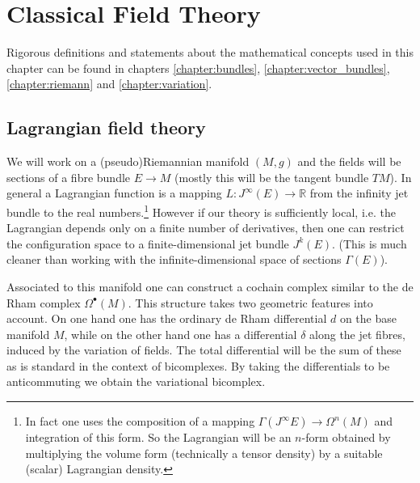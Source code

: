 \chapter{Classical Field Theory}\label{chapter:classical_fields}

	Rigorous definitions and statements about the mathematical concepts used in this chapter can be found in chapters \ref{chapter:bundles}, \ref{chapter:vector_bundles}, \ref{chapter:riemann} and \ref{chapter:variation}.

\section{Lagrangian field theory}

	We will work on a (pseudo)Riemannian manifold $(M, g)$ and the fields will be sections of a fibre bundle $E\rightarrow M$ (mostly this will be the tangent bundle $TM$). In general a Lagrangian function is a mapping $L:J^\infty(E)\rightarrow\mathbb{R}$ from the infinity jet bundle to the real numbers.\footnote{In fact one uses the composition of a mapping $\Gamma(J^\infty E)\rightarrow\Omega^n(M)$ and integration of this form. So the Lagrangian will be an $n$-form obtained by multiplying the volume form (technically a tensor density) by a suitable (scalar) Lagrangian density.} However if our theory is sufficiently local, i.e. the Lagrangian depends only on a finite number of derivatives, then one can restrict the configuration space to a finite-dimensional jet bundle $J^k(E)$. (This is much cleaner than working with the infinite-dimensional space of sections $\Gamma(E)$).

	Associated to this manifold one can construct a cochain complex similar to the de Rham complex $\Omega^\bullet(M)$. This structure takes two geometric features into account. On one hand one has the ordinary de Rham differential $d$ on the base manifold $M$, while on the other hand one has a differential $\delta$ along the jet fibres, induced by the variation of fields. The total differential will be the sum of these as is standard in the context of bicomplexes. By taking the differentials to be anticommuting we obtain the variational bicomplex.

